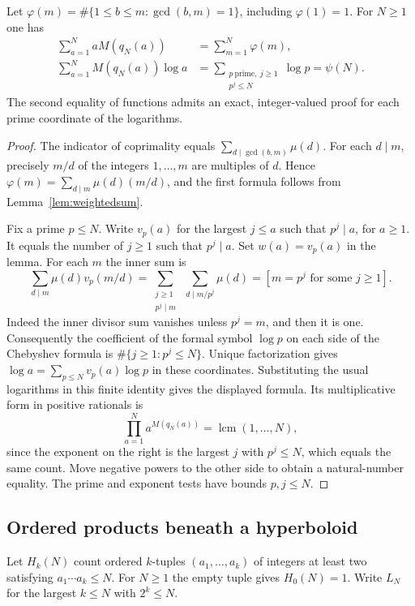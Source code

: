 \begin{theorem}\label{thm:totient-chebyshev}
Let $\varphi(m)=\#\{1\le b\le m:\gcd(b,m)=1\}$, including
$\varphi(1)=1$. For $N\ge1$ one has
\begin{align*}
 \sum_{a=1}^N aM(q_N(a)) &= \sum_{m=1}^N\varphi(m),\\
 \sum_{a=1}^N M(q_N(a))\log a
     &= \sum_{\substack{p\ \mathrm{prime},\ j\ge1\\p^j\le N}}\log p
      =\psi(N).
\end{align*}
The second equality of functions admits an exact, integer-valued proof
for each prime coordinate of the logarithms.
\end{theorem}
\begin{proof}
The indicator of coprimality equals $\sum_{d\mid\gcd(b,m)}\mu(d)$.
For each $d\mid m$, precisely $m/d$ of the integers $1,\ldots,m$ are
multiples of $d$. Hence
$\varphi(m)=\sum_{d\mid m}\mu(d)(m/d)$, and the first formula follows
from Lemma~\ref{lem:weightedsum}.

Fix a prime $p\le N$. Write $v_p(a)$ for the largest $j\le a$ such that
$p^j\mid a$, for $a\ge1$. It equals the number of $j\ge1$ such that
$p^j\mid a$. Set $w(a)=v_p(a)$ in the lemma. For each $m$ the inner sum is
\[
 \sum_{d\mid m}\mu(d)v_p(m/d)
 =\sum_{\substack{j\ge1\\p^j\mid m}}\;\sum_{d\mid m/p^j}\mu(d)
 =[m=p^j\text{ for some }j\ge1].
\]
Indeed the inner divisor sum vanishes unless $p^j=m$, and then it is
one. Consequently the coefficient of the formal symbol $\log p$ on each
side of the Chebyshev formula is $\#\{j\ge1:p^j\le N\}$. Unique
factorization gives $\log a=\sum_{p\le N}v_p(a)\log p$ in these
coordinates. Substituting the usual logarithms in this finite identity
gives the displayed formula. Its multiplicative form in positive rationals is
\[
  \prod_{a=1}^N a^{M(q_N(a))}=\operatorname{lcm}(1,\ldots,N),
\]
since the exponent on the right is the largest $j$ with $p^j\le N$,
which equals the same count. Move negative powers to the other side to
obtain a natural-number equality. The prime and exponent tests have
bounds $p,j\le N$.
\end{proof}

\subsection{Ordered products beneath a hyperboloid}
Let $H_k(N)$ count ordered $k$-tuples $(a_1,\ldots,a_k)$ of integers
at least two satisfying $a_1\cdots a_k\le N$. For $N\ge1$ the empty
tuple gives $H_0(N)=1$. Write $L_N$ for the largest $k\le N$ with
$2^k\le N$.

